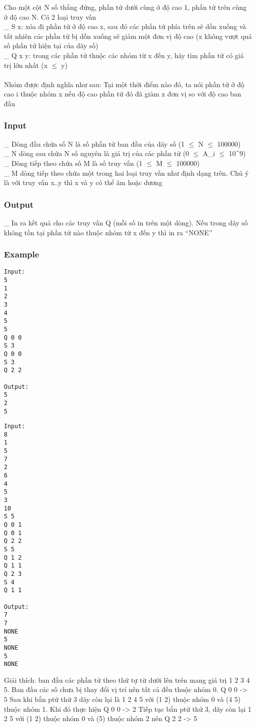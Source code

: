 



   Cho một cột N số thẳng đứng, phần tử dưới cùng ở độ cao 1, phần tử trên cùng ở độ cao N. Có 2 loại truy vấn   
\\   \_ S x: xóa đi phần tử ở độ cao x, sau đó các phần tử phía trên sẽ dồn xuống và tất nhiên các phần tử bị dồn xuống sẽ giảm một đơn vị độ cao (x không vượt quá số phần tử hiện tại của dãy số)   
\\   \_ Q x y: trong các phần tử thuộc các nhóm từ x đến y, hãy tìm phần tử có giá trị lớn nhất (x $\le$ y)   
\\
\\   Nhóm được định nghĩa như sau: Tại một thời điểm nào đó, ta nói phần tử ở độ cao i thuộc nhóm x nếu độ cao phần tử đó đã giảm x đơn vị so với độ cao ban đầu  

\subsubsection{   Input  }

   \_ Dòng đầu chứa số N là số phần tử ban đầu của dãy số (1 $\le$ N $\le$ 100000)   
\\   \_ N dòng sau chứa N số nguyên là giá trị của các phần tử (0 $\le$ A\_i $\le$ 10^9)   
\\   \_ Dòng tiếp theo chứa số M là số truy vấn (1 $\le$ M $\le$ 100000)   
\\   \_ M dòng tiếp theo chứa một trong hai loại truy vấn như định dạng trên. Chú ý là với truy vấn x..y thì x và y có thể âm hoặc dương   
\\

\subsubsection{   Output  }

   \_ In ra kết quả cho các truy vấn Q (mỗi số in trên một dòng). Nếu trong dãy số không tồn tại phần tử nào thuộc nhóm từ x đến y thì in ra “NONE”  

\subsubsection{   Example  }
\begin{verbatim}
Input:
5
1
2
3
4
5
5
Q 0 0
S 3
Q 0 0
S 3
Q 2 2

Output:
5
2
5
\end{verbatim}
\begin{verbatim}
Input:
8
1
5
7
2
6
4
5
3
10
S 5
Q 0 1
Q 0 1
Q 2 2
S 5
Q 1 2
Q 1 1
Q 2 3
S 4
Q 1 1

Output:
7
7
NONE
5
NONE
5
NONE
\end{verbatim}

   Giải thích: ban đầu các phần tử theo thứ tự từ dưới lên trên mang giá trị 1 2 3 4 5. Ban đầu các số chưa bị thay đổi vị trí nên tất cả đều thuộc nhóm 0. Q 0 0 -> 5 Sau khi bắn ptử thứ 3 dãy còn lại là 1 2 4 5 với (1 2) thuộc nhóm 0 và (4 5) thuộc nhóm 1. Khi đó thực hiện Q 0 0 -> 2 Tiếp tục bắn ptử thứ 3, dãy còn lại 1 2 5 với (1 2) thuộc nhóm 0 và (5) thuộc nhóm 2 nên Q 2 2 -> 5  
